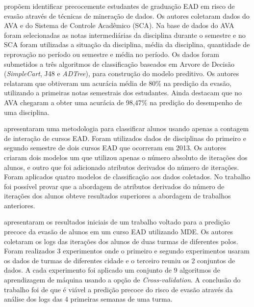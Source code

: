 \documentclass[diss,capa]{texufpel}
\begin{document}
    \citealp{Santos2014} propõem identificar precocemente estudantes de graduação EAD em risco de evasão através de técnicas de mineração de dados.
    Os autores coletaram dados do AVA e do Sistema de Controle Acadêmico (SCA).
    Na base de dados do AVA foram selecionadas as notas intermediárias da disciplina durante o semestre e no SCA foram utilizadas a situação da disciplina, média da disciplina, quantidade de reprovação no período ou semestre e média no período.
    Os dados foram submetidos a três algoritmos de classificação baseados em Arvore de Decisão (\textit{SimpleCart}, J48 e \textit{ADTree}), para construção do modelo preditivo.
    Os autores relataram que obtiveram um acurácia média de 80\% na predição da evasão, utilizando a primeiras notas semestrais dos estudantes.
    Ainda destacam que no AVA chegaram a obter uma acurácia de 98,47\% na predição do desempenho de uma disciplina.

    \citealp{detoni2015modelagem} apresentaram uma metodologia para classificar alunos usando apenas a contagem de interação de cursos EAD.
    Foram utilizados dados de disciplinas do primeiro e segundo semestre de dois cursos EAD que ocorreram em 2013.
    Os autores criaram dois modelos um que utilizou apenas o número absoluto de iterações dos alunos, e outro que foi adicionado atributos derivados do número de iterações.
    Foram aplicados quatro modelos de classificação aos dados coletados.
    No trabalho foi possível provar que a abordagem de atributos derivados do número de iterações dos alunos obteve resultados superiores a abordagem de trabalhos anteriores.
    
    \citealp{queiroga2015estudo} apresentaram os resultados iniciais de um trabalho voltado para a predição precoce da evasão de alunos em um curso EAD utilizando MDE.
    Os autores coletaram os logs das iterações dos alunos de duas turmas de diferentes polos.
    Foram realizados 3 experimentos onde o primeiro e segundo experimentos usaram os dados de turmas de diferentes cidade e o terceiro reuniu os 2 conjuntos de dados.
    A cada experimento foi aplicado um conjunto de 9 algoritmos de aprendizagem de máquina usando a opção de \textit{Cross-validation}.
    A conclusão do trabalho foi de que é viável a predição precoce do risco de evasão através da análise dos logs das 4 primeiras semanas de uma turma.
\end{document}
